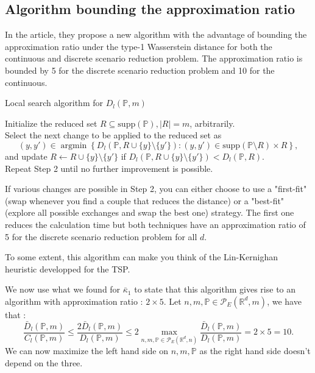 \documentclass{amsart}
\newcommand{\argmin}{\mathop{\arg\min}}
\newcommand{\RR}{\mathbb{R}}
\begin{document}
\subsection{Algorithm bounding the approximation ratio}
In the article, they propose a new algorithm with the advantage of bounding the approximation ratio under the type-1 Wasserstein distance for both the continuous and discrete scenario reduction problem. The approximation ratio is bounded by 5 for the discrete scenario reduction problem and 10 for the continuous.
\begin{algorithm}
    \caption{Local search algorithm for $D_l\left(\mathbb{P},m\right)$}
    Initialize the reduced set $R\subseteq \text{supp}\left(\mathbb{P}\right), \lvert R\rvert = m$, arbitrarily. \\ Select the next change to be applied to the reduced set as 
    $$
    \left(y,y'\right)\in\argmin\left\{D_l\left(\mathbb{P},R\cup\{y\}\setminus \{y'\}\right) : \left(y,y'\right)\in\text{supp}\left(\mathbb{P}\setminus R\right)\times R\right\},
    $$
    and update $R\gets R\cup \{y\}\setminus \{y'\}$ if $D_l\left(\mathbb{P}, R\cup\{y\}\setminus \{y'\} \right)<D_l\left(\mathbb{P},R\right).$ \\ Repeat Step 2 until no further improvement is possible.
\end{algorithm}
If various changes are possible in Step 2, you can either choose to use a "first-fit" (swap whenever you find a couple that reduces the distance) or a "best-fit" (explore all possible exchanges and swap the best one) strategy. The first one reduces the calculation time but both techniques have an approximation ratio of 5 for the discrete scenario reduction problem for all $d$.
\begin{remark}
    To some extent, this algorithm can make you think of the Lin-Kernighan heuristic developped for the TSP.
\end{remark}
We now use what we found for $\bar\kappa_1$ to state that this algorithm gives rise to an algorithm with approximation ratio : $2\times 5$. Let $n,m,\mathbb{P}\in\mathcal{P}_E\left(\RR^d,m\right)$, we have that : 
$$
\frac{\bar{D}_l\left(\mathbb{P},m\right)}{C_l\left(\mathbb{P},m\right)}\leq \frac{2\bar{D}_l\left(\mathbb{P},m\right)}{D_l\left(\mathbb{P},m\right)}\leq 2\max_{n,m,\mathbb{P}\in\mathcal{P}_E(\RR^d,n)}\frac{\bar{D}_l\left(\mathbb{P},m\right)}{D_l\left(\mathbb{P},m\right)}=2\times5=10.
$$
We can now maximize the left hand side on $n,m,\mathbb{P}$ as the right hand side doesn't depend on the three.
\end{document}
